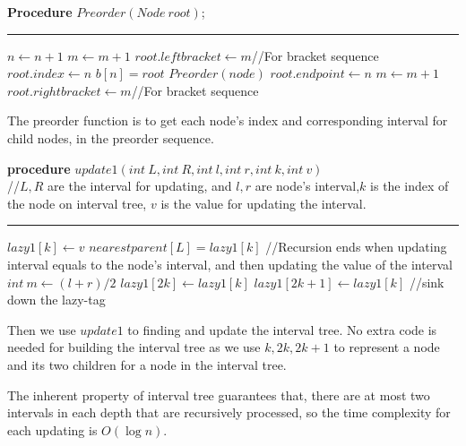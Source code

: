 \begin{algorithm}
	\label{alg:preorder}
	\textbf{Procedure} $Preorder(Node~root)$;
	\hrule
	$n \leftarrow n+1$\;
	$m \leftarrow m+1$
	$root.leftbracket \leftarrow m${\color{gray}//For bracket sequence}\; 
	$root.index \leftarrow n$\;
	$b[n]=root$\;
	{
		$Preorder(node)$
	}
	$root.endpoint \leftarrow n$\;
	$m \leftarrow m+1$\;
	$root.rightbracket \leftarrow m${\color{gray}//For bracket sequence}\; 
\end{algorithm}
The preorder function is to get each node's index and corresponding interval for child nodes, in the preorder sequence. 
\begin{algorithm}
	\textbf{procedure} $update1(int~L,int ~R, int~l, int~r, int~k, int~v)${\color{gray}
		\\//$L,R$ are the interval for updating, and $l,r$ are node's interval,$k$ is the index of the node on interval tree, $v$ is the value for updating the interval.}
	\hrule
	{
		 {$lazy1[k] \leftarrow v$}
		 {$nearestparent[L] = lazy1[k]$}
		{\color{gray}
		//Recursion ends when updating interval equals to the node's interval, and then updating the value of the interval}
	}
	{
		$int~m \leftarrow (l+r)/2$\;
		 {$lazy1[2k] \leftarrow lazy1[k]$}
		 {$lazy1[2k+1] \leftarrow lazy1[k]${\color{gray}
			//sink down the lazy-tag}}
	}
\end{algorithm}
Then we use $update1$ to finding and update the interval tree. No extra code is needed for building the interval tree as we use $k,2k,2k+1$ to represent a node and its two children for a node in the interval tree.

The inherent property of interval tree guarantees that, there are at most two intervals in each depth that are recursively processed, so the time complexity for each updating is $O(\log n)$.

